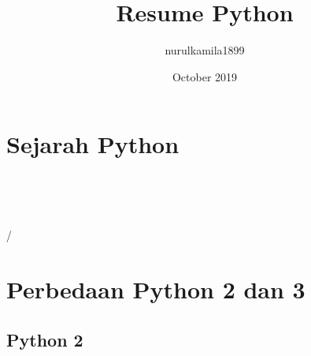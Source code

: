 \documentclass{article}
\title{Resume Python}
\author{nurulkamila1899 }
\date{October 2019}
\begin{document}
\maketitle

\section{Sejarah Python }
\usepackage{Python adalah Bahasa pemrograman interpretative multiguna dengan filosofi perancangan yang berfokus pada tingkat keterbacaan kode. Python dikembangkan oleh Guido van Rossum pada tahun 1990 di Stichting Mathematicsch Centrum (CWI), Amsterdam sebagai kelanjutan dari Bahasa pemrograman ABC. Saat 1995, Guido pindah ke CNRI di Virginia Amerika sambil terus melanjutkan pengembangan Python. Pada  2000, Guido dan para pengembang inti Python pindah ke BeOpen.com. Setelah itu, Guido dan beberapa anggota tim PythonLabs pindah ke DigitalCreations.}\\

\usepackage{Guido dan Python Software Foundation yang merupakan sebuah organisasi non-profit yang dibentuk sebagai pemegang hak cipta intelektual Python sejak versi 2.1  terus melakukan  pengembangan Python dan dengan demikian mencegah Python dimiliki oleh perusahaan komersial. }\\

\usepackage{Sebutan  Python dipilih oleh Guido sebagai nama bahasa ciptaannya karena kecintaan Guido pada acara televisi Monty Python’s Flying Circus. Dengan demikian seringkali ungkapan-ungkapan khas dari acara tersebut seringkali muncul dalam korespondensi antar pengguna Python.}

/
\section{Perbedaan Python 2 dan 3}
\subsection{	Python 2}
\usepackage{Dipublikasikan pada akhir tahun 2000. Python 2 dinilai lebih transparan dan inklusif untuk pengembangan software ketimbang versi sebelumnya. Hal ini didukung dengan adanya PEP-Python Enhancement Proposal, sebuah spesifikasi teknis yang menjadi tuntunan informasi untuk penggunaanya dan menggambarkan fitur baru pada Python itu sendiri.}\\

\usepackage{Python 2 dilengkapi dengan berbagai fitur programatikal seperti cycle-detecting garbage collector untuk mengotomasi manajemen memori, peningkatan dukungan untuk  Unicode, list comprehension untuk membuat sebuah list berdasarkan list yang sudah ada, unifikasi pada tipe data python dan class ke satu hirarki terjadi pada rilis Python 2.2}
\end{document}
